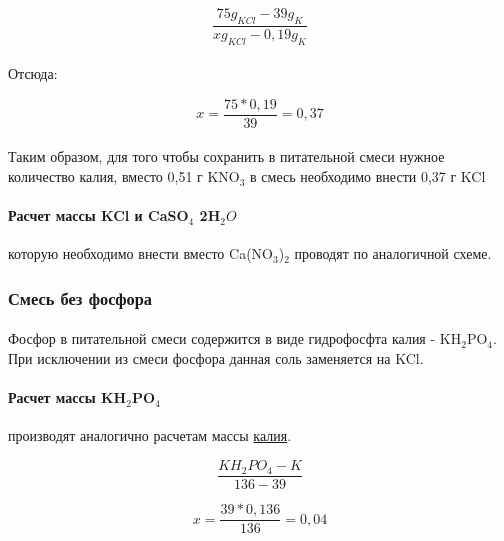 	\begin{equation}
		\frac{75 g_{KCl} - 39 g_{K}}{x g_{KCl} - 0,19 g_{K}}
	\end{equation}
	
\paragraph*{}Отсюда:

\begin{equation}
		x = \frac{75*0,19}{39} = 0,37
	\end{equation}
	
\paragraph*{}Таким образом, для  того чтобы сохранить в питательной смеси нужное количество калия, вместо 0,51 г KNO$_3$ в смесь необходимо внести 0,37 г KCl

\paragraph*{Расчет массы KCl и CaSO${_4}$ \textperiodcentered 2H${_2}O$} которую необходимо внести вместо Ca(NO${_3}$)${_2}$ проводят по аналогичной схеме.

\subsubsection*{Смесь без фосфора}

\paragraph*{}Фосфор в питательной смеси содержится в виде гидрофосфта калия - KH${_2}$PO${_4}$. При исключении из смеси фосфора данная соль заменяется на KCl.

\paragraph*{Расчет массы KH${_2}$PO${_4}$} производят аналогично расчетам массы \hyperlink{potashyum_mass}{калия}.

\begin{equation}
	\frac{KH{_2}PO{_4} - K}{136 - 39}
\end{equation}

\begin{equation}
		x = \frac{39*0,136}{136} = 0,04
	\end{equation}


